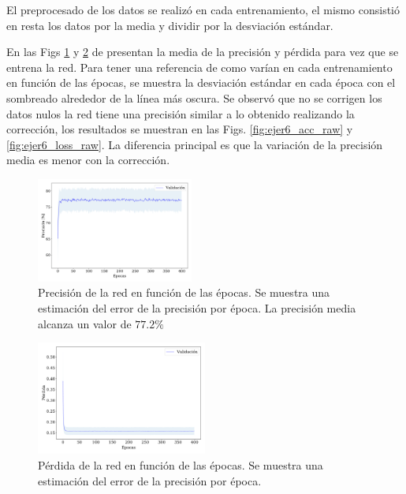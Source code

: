    El preprocesado de los datos se realizó en cada entrenamiento, el mismo consistió en resta los datos por la media y dividir por la desviación estándar.

    En las  Figs \ref{fig:ejer6_acc} y \ref{fig:ejer6_loss} de presentan la media de la precisión y pérdida para vez que se entrena la red. Para tener una referencia de como varían en cada entrenamiento en función de las épocas,  se muestra  la desviación estándar en cada época con el sombreado alrededor de la línea más oscura. Se observó que no se corrigen los datos nulos la red tiene una precisión similar a lo obtenido realizando la corrección, los resultados se muestran en las Figs. \ref{fig:ejer6_acc_raw} y \ref{fig:ejer6_loss_raw}. La diferencia principal es que la variación de la precisión media es menor con la corrección.

    \begin{figure}[H]
        \begin{small}
            \begin{center}
                \includegraphics[width=0.46\textwidth]{Graphs/ejer6_acc.pdf}
            \end{center}
            \caption{Precisión de la red en función de las épocas. Se muestra una estimación del error de la precisión por época. La precisión media alcanza un valor de $77.2\%$}
            \label{fig:ejer6_acc}
        \end{small}
    \end{figure}


    \begin{figure}[H]
        \begin{small}
            \begin{center}
                \includegraphics[width=0.5\textwidth]{Graphs/ejer6_loss.pdf}
            \end{center}
            \caption{Pérdida de la red en función de las épocas. Se muestra una estimación del error de la precisión por época.}
            \label{fig:ejer6_loss}
        \end{small}
    \end{figure}

